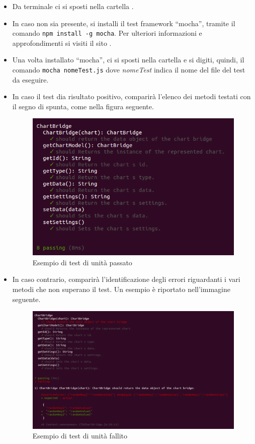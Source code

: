 						\begin{itemize}
							\item Da terminale ci si sposti nella cartella .
							\item In caso non sia presente, si installi il test framework “mocha”, tramite il comando \texttt{npm install -g mocha}. Per ulteriori informazioni e approfondimenti si visiti il sito .
							\item Una volta installato “mocha”, ci si sposti nella cartella  e si digiti, quindi, il comando \texttt{mocha nomeTest.js} dove \textit{nomeTest} indica il nome del file del test da eseguire. 
							\item In caso il test dia risultato positivo, comparirà l'elenco dei metodi testati con il segno di spunta, come nella figura seguente.
							\begin{figure}[H]
								\centering
								\includegraphics[scale=0.5]{Pics/TUpassing.png}
								\caption{Esempio di test di unità passato}
							\end{figure}
							\item In caso contrario, comparirà l'identificazione degli errori riguardanti i vari metodi che non superano il test. Un esempio è riportato nell'immagine seguente.
							\begin{figure}[H]
								\centering
								\includegraphics[scale=0.4]{Pics/TUnotPassing.png}
								\caption{Esempio di test di unità fallito}
							\end{figure}
						\end{itemize}
